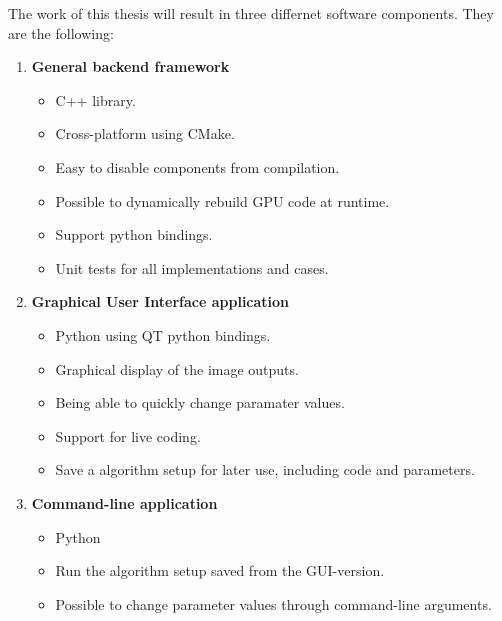 The work of this thesis will result in three differnet software components. They are the following:

\begin{enumerate}
\item{\bf{General backend framework}}
\begin{itemize}
\item{C++ library.}
\item{Cross-platform using CMake.}
\item{Easy to disable components from compilation.}
\item{Possible to dynamically rebuild GPU code at runtime.}
\item{Support python bindings.}
\item{Unit tests for all implementations and cases.}
\end{itemize}

\item{\bf{Graphical User Interface application}}
\begin{itemize}
\item{Python using QT python bindings.}
\item{Graphical display of the image outputs.}
\item{Being able to quickly change paramater values.}
\item{Support for live coding.}
\item{Save a algorithm setup for later use, including code and parameters.}
\end{itemize}

\item{\bf{Command-line application}}
\begin{itemize}
\item{Python}
\item{Run the algorithm setup saved from the GUI-version.}
\item{Possible to change parameter values through command-line arguments.}
\end{itemize}
\end{enumerate}
